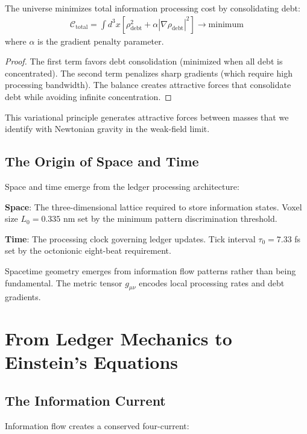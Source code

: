 \documentclass[12pt]{article}
\begin{document}
\begin{theorem}
The universe minimizes total information processing cost by consolidating debt:
\begin{align}
\mathcal{C}_{\text{total}} = \int d^3x \left[ \rho_{\text{debt}}^2 + \alpha |\nabla \rho_{\text{debt}}|^2 \right] \to \text{minimum}
\end{align}
where $\alpha$ is the gradient penalty parameter.
\end{theorem}

\begin{proof}
The first term favors debt consolidation (minimized when all debt is concentrated). The second term penalizes sharp gradients (which require high processing bandwidth). The balance creates attractive forces that consolidate debt while avoiding infinite concentration.
\end{proof}

This variational principle generates attractive forces between masses that we identify with Newtonian gravity in the weak-field limit.

\subsection{The Origin of Space and Time}

Space and time emerge from the ledger processing architecture:

\textbf{Space}: The three-dimensional lattice required to store information states. Voxel size $L_0 = 0.335$ nm set by the minimum pattern discrimination threshold.

\textbf{Time}: The processing clock governing ledger updates. Tick interval $\tau_0 = 7.33$ fs set by the octonionic eight-beat requirement.

Spacetime geometry emerges from information flow patterns rather than being fundamental. The metric tensor $g_{\mu\nu}$ encodes local processing rates and debt gradients.

\section{From Ledger Mechanics to Einstein's Equations}

\subsection{The Information Current}

Information flow creates a conserved four-current:
\end{document}
